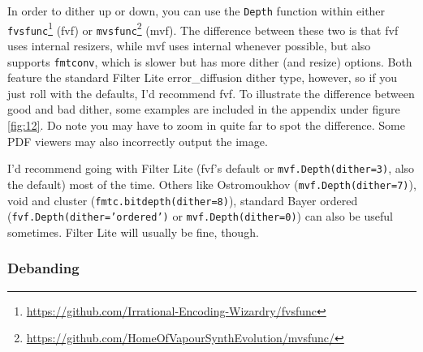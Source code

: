 \documentclass{scrartcl}
\begin{document}
In order to dither up or down, you can use the \texttt{Depth} function within either \texttt{fvsfunc}\footnote{\url{https://github.com/Irrational-Encoding-Wizardry/fvsfunc}} (fvf) or \texttt{mvsfunc}\footnote{\url{https://github.com/HomeOfVapourSynthEvolution/mvsfunc/}} (mvf).  The difference between these two is that fvf uses internal resizers, while mvf uses internal whenever possible, but also supports \texttt{fmtconv}, which is slower but has more dither (and resize) options.  Both feature the standard Filter Lite error\_diffusion dither type, however, so if you just roll with the defaults, I'd recommend fvf.  To illustrate the difference between good and bad dither, some examples are included in the appendix under figure \ref{fig:12}.  Do note you may have to zoom in quite far to spot the difference.  Some PDF viewers may also incorrectly output the image.

I'd recommend going with Filter Lite (fvf's default or \texttt{mvf.Depth(dither=3)}, also the default) most of the time.  Others like Ostromoukhov (\texttt{mvf.Depth(dither=7)}), void and cluster (\texttt{fmtc.bitdepth(dither=8)}), standard Bayer ordered (\texttt{fvf.Depth(dither='ordered')} or \texttt{mvf.Depth(dither=0)}) can also be useful sometimes.  Filter Lite will usually be fine, though.

\subsubsection{Debanding}

\end{document}

